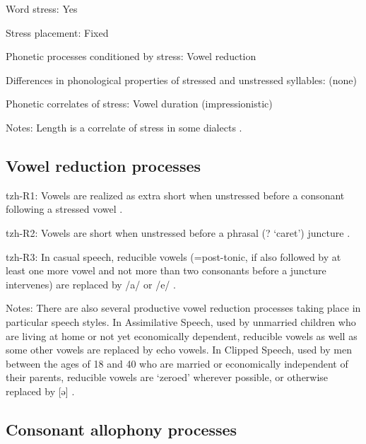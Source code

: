 {\begin{appendixdesc}
\item[Word stress:] Yes

\item[Stress placement:] Fixed

\item[Phonetic processes conditioned by stress:] Vowel reduction

\item[Differences in phonological properties of stressed and unstressed syllables:] (none)

\item[Phonetic correlates of stress:] Vowel duration (impressionistic)

\item[Notes:] Length is a correlate of stress in some dialects \citep[23]{Polian2006}.
\end{appendixdesc}
\subsection*{Vowel reduction processes}
\begin{appendixdesc}

\item[tzh-R1:] Vowels are realized as extra short when unstressed before a consonant following a stressed vowel \citep[12]{Kaufman1971}.

\item[tzh-R2:] Vowels are short when unstressed before a phrasal (? ‘caret’) juncture \citep[12]{Kaufman1971}.

\item[tzh-R3:] In casual speech, reducible vowels (=post-tonic, if also followed by at least one more vowel and not more than two consonants before a juncture intervenes) are replaced by /a/ or /e/ \citep[26--27]{Kaufman1971}.

\item[Notes:] There are also several productive vowel reduction processes taking place in particular speech styles. In Assimilative Speech, used by unmarried children who are living at home or not yet economically dependent, reducible vowels as well as some other vowels are replaced by echo vowels. In Clipped Speech, used by men between the ages of 18 and 40 who are married or economically independent of their parents, reducible vowels are ‘zeroed’ wherever possible, or otherwise replaced by [ə] \citep[26--27]{Kaufman1971}.
\end{appendixdesc}
\subsection*{Consonant allophony processes}
\begin{appendixdesc}


\end{appendixdesc}}
